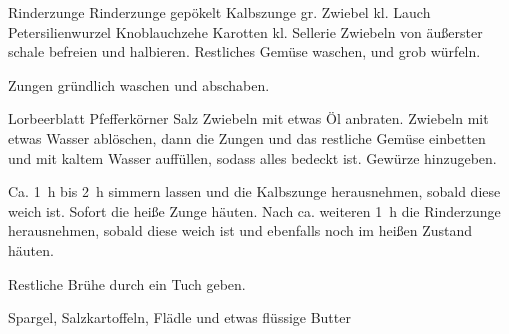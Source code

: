 \begin{MyRecipe}{Rinderzunge}{}{}
	\ingredient[\Calc{1}{\x}]{} {Rinderzunge gepökelt}
	\ingredient[\Calc{1}{\x}]{} {Kalbszunge}
	\ingredient[\Calc{1}{\x}]{} {gr. Zwiebel}
	\ingredient[\Calc{1}{\x}]{} {kl. Lauch}
	\ingredient[\Calc{1}{\x}]{} {Petersilienwurzel}
	\ingredient[\Calc{1}{\x}]{} {Knoblauchzehe}
	\ingredient[\Calc{2}{\x}]{} {Karotten}
	\ingredient[\Calc{0.5}{\x}]{} {kl. Sellerie}
	Zwiebeln von äußerster schale befreien und halbieren. Restliches Gemüse waschen, und grob würfeln.

	Zungen gründlich waschen und abschaben.\par\bigskip
	
	\ingredient[\Calc{1}{\x}]{} {Lorbeerblatt}
	 {Pfefferkörner}
	 {Salz}
	Zwiebeln mit etwas Öl anbraten. Zwiebeln mit etwas Wasser ablöschen, dann die Zungen und das restliche Gemüse einbetten und mit kaltem Wasser auffüllen, sodass alles bedeckt ist.
	Gewürze hinzugeben.\par\bigskip
	
	Ca. \SI{1}{\hour} bis \SI{2}{\hour} simmern lassen und die Kalbszunge herausnehmen, sobald diese weich ist. Sofort die heiße Zunge häuten. Nach ca. weiteren \SI{1}{\hour} die Rinderzunge herausnehmen, sobald diese weich ist und ebenfalls noch im heißen Zustand häuten.

	Restliche Brühe durch ein Tuch geben.\par\bigskip

	Spargel, Salzkartoffeln, Flädle und etwas flüssige Butter
	

	
	
	
\end{MyRecipe}